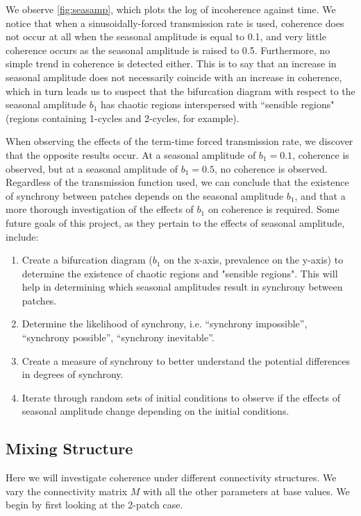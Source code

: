 \documentclass[12pt]{article}
\begin{document}
We observe \autoref{fig:seasamp}, which plots the log of incoherence against time. We notice that when a sinusoidally-forced transmission rate is used, coherence does not occur at all when the seasonal amplitude is equal to 0.1, and very little coherence occurs as the seasonal amplitude is raised to 0.5. Furthermore, no simple trend in coherence is detected either. This is to say that an increase in seasonal amplitude does not necessarily coincide with an increase in coherence, which in turn leads us to suspect that the bifurcation diagram with respect to the seasonal amplitude $b_1$ has chaotic regions interspersed with ``sensible regions" (regions containing 1-cycles and 2-cycles, for example).

When observing the effects of the term-time forced transmission rate, we discover that the opposite results occur. At a seasonal amplitude of $b_1 = 0.1$, coherence is observed, but at a seasonal amplitude of $b_1 = 0.5$, no coherence is observed. Regardless of the transmission function used, we can conclude that the existence of synchrony between patches depends on the seasonal amplitude $b_1$, and that a more thorough investigation of the effects of $b_1$ on coherence is required. 
Some future goals of this project, as they pertain to the effects of seasonal amplitude, include:

\begin{enumerate}

\item Create a bifurcation diagram ($b_1$ on the x-axis, prevalence on the y-axis) to determine the existence of chaotic regions and "sensible regions". This will help in determining which seasonal amplitudes result in synchrony between patches.

\item Determine the likelihood of synchrony, i.e. ``synchrony impossible'', ``synchrony possible'', ``synchrony inevitable''.

\item Create a measure of synchrony to better understand the potential differences in degrees of synchrony.

\item Iterate through random sets of initial conditions to observe if the effects of seasonal amplitude change depending on the initial conditions.

\end{enumerate}

\subsection{Mixing Structure}
\label{ss:mixingstructure}
Here we will investigate coherence under different connectivity structures. We vary the connectivity matrix $M$ with all the other parameters at base values. We begin by first looking at the 2-patch case.
\end{document}
